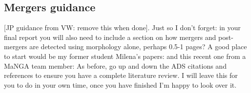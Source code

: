 \subsection{Mergers guidance}
[JP guidance from VW: remove this when done].
Just so I don't forget: in your final report you will also need to include a section on how mergers and post-mergers are detected using morphology alone, perhaps 0.5-1 pages? A good place to start would be my former student Milena's papers: \citet{2016MNRAS.456.3032P} 
\citet{2018MNRAS.477.1708P} 
\citet{2019NatAs...3..440P} 
and this recent one from a MaNGA team member: \citet{2019ApJ...872...76N} 
As before, go up and down the ADS citations and references to ensure you have a complete literature review. 
I will leave this for you to do in your own time, once you have finished I'm happy to look over it. 
